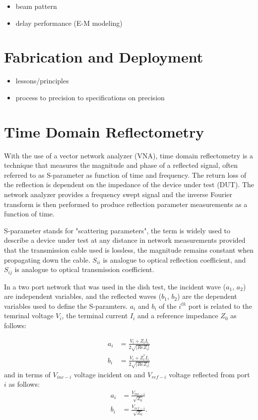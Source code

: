 \documentclass[preprint]{aastex}  %
\begin{document}
\begin{itemize}
\item beam pattern
\item delay performance (E-M modeling)
\end{itemize}

\section{Fabrication and Deployment}
\label{sec:deploy}

\begin{itemize}
\item lessons/principles
\item process to precision to specifications on precision
\end{itemize}
\clearpage

\section{Time Domain Reflectometry}
\label{sec:reflect}
With the use of a vector network analyzer (VNA), time domain reflectometry is a
technique that measures the magnitude and phase of a reflected signal, often 
referred to as S-parameter as function of time and frequency. The return loss 
of the reflection is dependent on the impedance of the device under test (DUT). The 
network analyzer provides a frequency swept signal and the inverse Fourier 
transform is then performed to produce reflection parameter measurements as a 
function of time.

S-parameter stands for "scattering parameters", the term is widely used to describe a device 
under test at any distance in network measurements provided that the transmission cable used 
is lossless, the magnitude remains constant when propagating down the cable. $S_{ii}$ is 
analogue to optical reflection coefficient, and $S_{ij}$ is analogue to optical transmission 
coefficient.

In a two port network that was used in the dish test, the incident wave ($a_1$, 
$a_2$) are independent variables, and the reflected waves ($b_1$, $b_2$) are 
the dependent variables used to define the S-paramters. $a_i$ and $b_i$ of the $i^{th}$ port is 
related to the temrinal voltage $V_i$, the terminal current $I_i$ and a reference impedance 
$Z_0$ as follows:

\begin{align}
a_i &= \frac{V_i+Z_iI_i}{2\sqrt{|{Re Z_i}|}}  \\
b_i &= \frac{V_i+Z_i^{*}I_i}{2\sqrt{|{Re Z_i}|}}
\label{Eqn:ab}
\end{align}
\noindent and in terms of $V_{inc-i}$ voltage incident on and $V_{ref-i}$ voltage reflected from port $i$ as follows:
\begin{align}
a_i &= \frac{V_{inc-i}}{\sqrt{Z_0}} \\
b_i &= \frac{V_{ref-i}}{\sqrt{Z_0}}.
\end{align}
\end{document}
